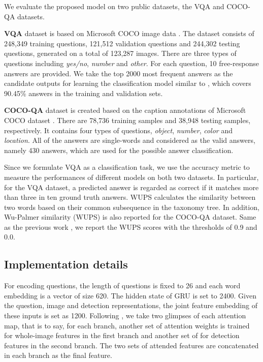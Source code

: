 \documentclass[letterpaper]{article}
\begin{document}
{We evaluate the proposed model on two public datasets, the VQA \cite{antol2015vqa} and COCO-QA \cite{ren2015exploring} datasets.

\textbf{VQA} dataset \cite{antol2015vqa} is based on Microsoft COCO image data \cite{lin2014microsoft}.
The dataset consists of 248,349 training questions, 121,512 validation questions and 244,302 testing questions, generated on a total of 123,287 images. There are three types of questions including \textit{yes/no}, \textit{number} and \textit{other}. For each question, 10 free-response answers are provided. We take the top 2000 most frequent answers as the candidate outputs for learning the classification model similar to \cite{kim2016multimodal}, which covers 90.45\% answers in the training and validation sets.

\textbf{COCO-QA} dataset \cite{ren2015exploring} is created based on the caption annotations of Microsoft COCO dataset \cite{lin2014microsoft}. There are 78,736 training samples and 38,948 testing samples, respectively. It contains four types of questions, \textit{object}, \textit{number}, \textit{color} and \textit{location}. All of the answers are single-words and considered as the valid answers, namely 430 answers, which are used for the possible answer classification.

Since we formulate VQA as a classification task, we use the accuracy metric to measure the performances of different models on both two datasets. In particular, for the VQA dataset, a predicted answer is regarded as correct if it matches more than three in ten ground truth answers. WUPS calculates the similarity between two words based on their common subsequence in the taxonomy tree. In addition, Wu-Palmer similarity (WUPS) \cite{wu1994verbs} is also reported for the COCO-QA dataset. Same as the previous work \cite{lu2016hierarchical,li2016visual}, we report the WUPS scores with the thresholds of 0.9 and 0.0.



\subsection{Implementation details}


For encoding questions, the length of questions is fixed to 26 and each word embedding is a vector of size 620. The hidden state of GRU is set to 2400. Given the question, image and detection representations, the joint feature embedding of these inputs  is set as 1200. Following \cite{kim2016hadamard}, we take two glimpses of each attention map, that is to say, for each branch, another set of attention weights  is trained for whole-image features  in the first branch and another set of  for detection features  in the second branch. The two sets of attended features are concatenated in each branch as the final feature.

}
\end{document}
